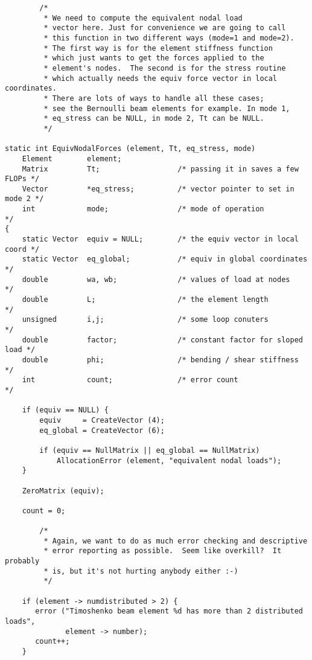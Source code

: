{\small
\begin{screen}
 \begin{verbatim}
        /*
         * We need to compute the equivalent nodal load
         * vector here. Just for convenience we are going to call 
         * this function in two different ways (mode=1 and mode=2).
         * The first way is for the element stiffness function
         * which just wants to get the forces applied to the 
         * element's nodes.  The second is for the stress routine
         * which actually needs the equiv force vector in local coordinates.
         * There are lots of ways to handle all these cases;
         * see the Bernoulli beam elements for example. In mode 1,
         * eq_stress can be NULL, in mode 2, Tt can be NULL.
         */

static int EquivNodalForces (element, Tt, eq_stress, mode)
    Element        element;
    Matrix         Tt;                  /* passing it in saves a few FLOPs */ 
    Vector         *eq_stress;          /* vector pointer to set in mode 2 */
    int            mode;                /* mode of operation               */
{
    static Vector  equiv = NULL;        /* the equiv vector in local coord */
    static Vector  eq_global;           /* equiv in global coordinates     */
    double         wa, wb;              /* values of load at nodes         */
    double         L;                   /* the element length              */
    unsigned       i,j;                 /* some loop conuters              */
    double         factor;              /* constant factor for sloped load */
    double         phi;                 /* bending / shear stiffness       */
    int            count;               /* error count                     */

    if (equiv == NULL) {
        equiv     = CreateVector (4);
        eq_global = CreateVector (6);
  
        if (equiv == NullMatrix || eq_global == NullMatrix) 
            AllocationError (element, "equivalent nodal loads");
    }

    ZeroMatrix (equiv);

    count = 0;

        /*
         * Again, we want to do as much error checking and descriptive
         * error reporting as possible.  Seem like overkill?  It probably
         * is, but it's not hurting anybody either :-)
         */

    if (element -> numdistributed > 2) {
       error ("Timoshenko beam element %d has more than 2 distributed loads",
              element -> number);
       count++;
    }


\end{verbatim}
\end{screen}}
